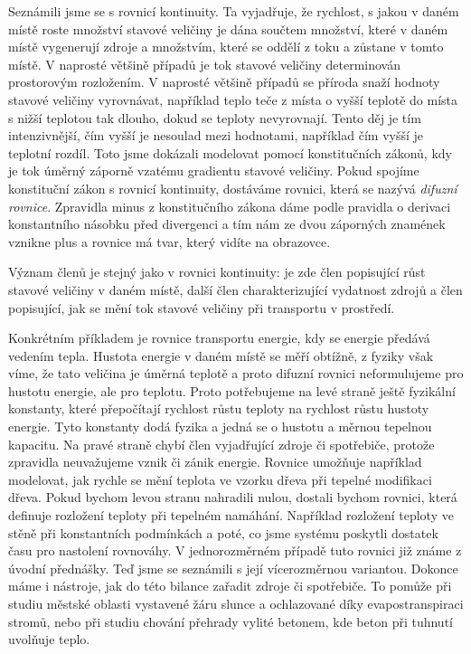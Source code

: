 \documentclass[12pt]{article}
\begin{document}
Seznámili jsme se s rovnicí kontinuity. Ta vyjadřuje, že rychlost, s jakou v daném místě roste množství stavové veličiny je dána součtem množství, které v daném místě vygenerují zdroje a množstvím, které se oddělí z toku a zůstane v tomto místě. 
V naprosté většině případů je tok stavové veličiny determinován prostorovým rozložením. V naprosté většině případů se příroda snaží hodnoty stavové veličiny vyrovnávat, například teplo teče z místa o vyšší teplotě do místa s nižší teplotou tak dlouho, dokud se teploty nevyrovnají. Tento děj je tím intenzivnější, čím vyšší je nesoulad mezi hodnotami, například čím vyšší je teplotní rozdíl. Toto jsme dokázali modelovat pomocí konstitučních zákonů, kdy je tok úměrný záporně vzatému gradientu stavové veličiny. Pokud spojíme konstituční zákon s rovnicí kontinuity, dostáváme rovnici, která se nazývá \textit{difuzní rovnice}. Zpravidla minus z konstitučního zákona dáme podle pravidla o derivaci konstantního násobku před divergenci a tím nám ze dvou záporných znamének vznikne plus a rovnice má tvar, který vidíte na obrazovce.

Význam členů je stejný jako v rovnici kontinuity: je zde člen popisující růst stavové veličiny v daném místě, další člen charakterizující vydatnost zdrojů a člen popisující, jak se mění tok stavové veličiny při transportu v prostředí.

Konkrétním příkladem je rovnice transportu energie, kdy se energie předává vedením tepla. Hustota energie v daném místě se měří obtížně, z fyziky však víme, že tato veličina je úměrná teplotě a proto difuzní rovnici neformulujeme pro hustotu energie, ale pro teplotu. Proto potřebujeme na levé straně ještě fyzikální konstanty, které přepočítají rychlost růstu teploty na rychlost růstu hustoty energie. Tyto konstanty dodá fyzika a jedná se o hustotu a měrnou tepelnou kapacitu. Na pravé straně chybí člen vyjadřující zdroje či spotřebiče, protože zpravidla neuvažujeme vznik či zánik energie. Rovnice umožňuje například modelovat, jak rychle se mění teplota ve vzorku dřeva při tepelné modifikaci dřeva. Pokud bychom levou stranu nahradili nulou, dostali bychom rovnici, která definuje rozložení teploty při tepelném namáhání. Například rozložení teploty ve stěně při konstantních podmínkách a poté, co jsme systému poskytli dostatek času pro nastolení rovnováhy. V jednorozměrném případě tuto rovnici již známe z úvodní přednášky. Teď jsme se seznámili s její vícerozměrnou variantou. Dokonce máme i nástroje, jak do této bilance zařadit zdroje či spotřebiče. To pomůže při studiu městské oblasti vystavené žáru slunce a ochlazované díky evapostranspiraci stromů, nebo při studiu chování přehrady vylité betonem, kde beton při tuhnutí uvolňuje teplo.
\end{document}
